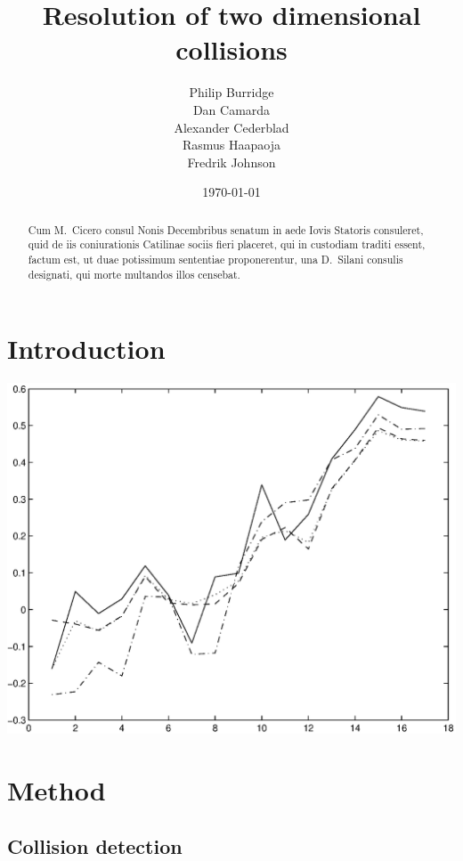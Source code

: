 \documentclass[a4paper,12pt]{report}
\title{Resolution of two dimensional collisions}
\author{Philip Burridge\\
        Dan Camarda\\
        Alexander Cederblad\\
        Rasmus Haapaoja\\
        Fredrik Johnson}
\date{\today}
\begin{document}
\maketitle


\begin{abstract}
Cum M.~Cicero consul Nonis Decembribus senatum in aede Iovis Statoris consuleret, quid de iis coniurationis Catilinae sociis fieri placeret, qui in custodiam traditi essent, factum est, ut duae potissimum sententiae proponerentur, una D.~Silani consulis designati, qui morte multandos illos censebat\cite{gdm}.
\end{abstract}


\tableofcontents


\chapter{Introduction}
\setcounter{page}{1}

\lipsum[0-1]

\includegraphics[scale=0.5]{figures/result.eps}

\lipsum[0-1]


\chapter{Method}

\section{Collision detection}
\end{document}
